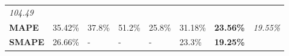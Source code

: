 \documentclass[11pt]{article}
\begin{document}
\begin{longtable}[]{@{}llllllll@{}}
\begin{minipage}[t]{0.10\columnwidth}
\emph{104.49}\strut
\end{minipage}\tabularnewline
\begin{minipage}[t]{0.10\columnwidth}\raggedright
\textbf{MAPE}\strut
\end{minipage} & \begin{minipage}[t]{0.10\columnwidth}\raggedright
35.42\%\strut
\end{minipage} & \begin{minipage}[t]{0.10\columnwidth}\raggedright
37.8\%\strut
\end{minipage} & \begin{minipage}[t]{0.10\columnwidth}\raggedright
51.2\%\strut
\end{minipage} & \begin{minipage}[t]{0.10\columnwidth}\raggedright
25.8\%\strut
\end{minipage} & \begin{minipage}[t]{0.10\columnwidth}\raggedright
31.18\%\strut
\end{minipage} & \begin{minipage}[t]{0.10\columnwidth}\raggedright
\textbf{23.56\%}\strut
\end{minipage} & \begin{minipage}[t]{0.10\columnwidth}\raggedright
\emph{19.55\%}\strut
\end{minipage}\tabularnewline
\begin{minipage}[t]{0.10\columnwidth}\raggedright
\textbf{SMAPE}\strut
\end{minipage} & \begin{minipage}[t]{0.10\columnwidth}\raggedright
26.66\%\strut
\end{minipage} & \begin{minipage}[t]{0.10\columnwidth}\raggedright
-\strut
\end{minipage} & \begin{minipage}[t]{0.10\columnwidth}\raggedright
-\strut
\end{minipage} & \begin{minipage}[t]{0.10\columnwidth}\raggedright
-\strut
\end{minipage} & \begin{minipage}[t]{0.10\columnwidth}\raggedright
23.3\%\strut
\end{minipage} & \begin{minipage}[t]{0.10\columnwidth}\raggedright
\textbf{19.25\%}\strut
\end{minipage} & \begin{minipage}[t]{0.10\columnwidth}\raggedright

\end{minipage}
\end{longtable}
\end{document}
